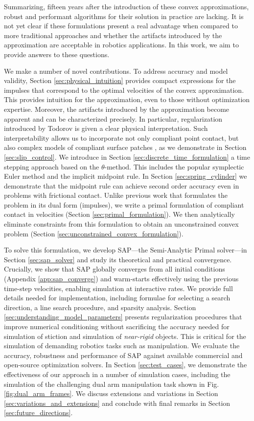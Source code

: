 Summarizing, fifteen years after the introduction of these convex
approximations, robust and performant algorithms for their solution in practice
are lacking. It is not yet clear if these formulations present a real advantage
when compared to more traditional approaches and whether the artifacts
introduced by the approximation are acceptable in robotics applications. In this
work, we aim to provide answers to these questions. 

We make a number of novel contributions. To address accuracy and model validity,
Section \ref{sec:physical_intuition} provides compact expressions for the
impulses that correspond to the optimal velocities of the convex approximation.
This provides intuition for the approximation, even to those without
optimization expertise. Moreover, the artifacts introduced by the approximation
become apparent and can be characterized precisely. In particular,
regularization introduced by Todorov \cite{bib:todorov2014} is given a clear
physical interpretation. Such interpretability  allows us to incorporate not
only compliant point contact, but also complex models of compliant surface
patches \cite{bib:elandt2019pressure}, as we demonstrate in Section
\ref{sec:slip_control}. We introduce in Section
\ref{sec:discrete_time_formulation} a time stepping approach based on the
$\theta\text{-method}$. This includes the popular symplectic Euler method and
the implicit midpoint rule. In Section \ref{sec:spring_cylinder} we demonstrate
that the midpoint rule can achieve second order accuracy even in problems with
frictional contact. Unlike previous work \cite{bib:anitescu2010,bib:todorov2014}
that formulates the problem in its dual form (impulses), we write a primal
formulation of compliant contact in velocities (Section
\ref{sec:primal_formulation}). We then analytically eliminate constraints from
this formulation to obtain an unconstrained convex problem (Section
\ref{sec:unconstrained_convex_formulation}).

To solve this formulation, we develop SAP---the Semi-Analytic Primal solver---in
Section \ref{sec:sap_solver} and study its theoretical and practical
convergence.  Crucially, we show that SAP globally converges from all initial
conditions (Appendix \ref{app:sap_converge}) and warm-starts effectively using
the previous time-step velocities, enabling simulation at interactive rates. We
provide full details needed for implementation, including formulae for selecting
a search direction, a line search procedure, and sparsity analysis. Section
\ref{sec:understanding_model_parameters} presents regularization procedures that
improve numerical conditioning without sacrificing the accuracy needed for
simulation of stiction and simulation of \emph{near-rigid} objects. This is
critical for the simulation of demanding robotics tasks such as manipulation. We
evaluate the accuracy, robustness and performance of SAP against available
commercial and open-source optimization solvers. In Section
\ref{sec:test_cases}, we demonstrate the effectiveness of our approach in a
number of simulation cases, including the simulation of the challenging dual arm
manipulation task shown in Fig. \ref{fig:dual_arm_frames}. We discuss extensions
and variations in Section \ref{sec:variations_and_extensions} and conclude with
final remarks in Section \ref{sec:future_directions}.
